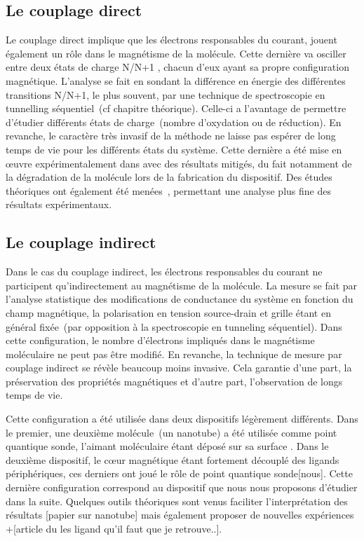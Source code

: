 \subsection{Le couplage direct}
Le couplage direct implique que les électrons responsables du courant, jouent également un rôle dans le magnétisme de la molécule. Cette dernière va osciller entre deux états de charge N/N+1 , chacun d'eux ayant sa propre configuration magnétique. L'analyse se fait en sondant la différence en énergie des différentes transitions N/N+1, le plus souvent, par une technique de spectroscopie en tunnelling séquentiel~(cf chapitre théorique). Celle-ci a l'avantage de permettre d'étudier différents états de charge~(nombre d'oxydation ou de réduction). En revanche, le caractère très invasif de la méthode ne laisse pas espérer de long temps de vie pour les différents états du système. Cette dernière a été mise en œuvre expérimentalement dans \cite{Heersche2006,Jo2006,Zyazin2010} avec des résultats mitigés, du fait notamment de la dégradation de la molécule lors de la fabrication du dispositif. Des études théoriques ont également été menées~\cite{Timm2006,Timm2007}, permettant une analyse plus fine des résultats expérimentaux.

\subsection{Le couplage indirect}

Dans le cas du couplage indirect, les électrons responsables du courant ne participent qu'indirectement au magnétisme de la molécule. La mesure se fait par l'analyse statistique des modifications de conductance du système en fonction du champ magnétique, la polarisation en tension source-drain et grille étant en général fixée~(par opposition à la spectroscopie en tunneling séquentiel). Dans cette configuration, le nombre d'électrons impliqués dans le magnétisme moléculaire ne peut pas être modifié. En revanche, la technique de mesure par couplage indirect se révèle beaucoup moins invasive. Cela garantie d'une part, la préservation des propriétés magnétiques et d'autre part, l'observation de longs temps de vie. 

Cette configuration a été utilisée dans deux dispositifs légèrement différents. Dans le premier, une deuxième molécule~(un nanotube) a été utilisée comme point quantique sonde, l'aimant moléculaire étant déposé sur sa surface \cite{Urdampilleta2011}. Dans le deuxième dispositif, le cœur magnétique étant fortement découplé des ligands périphériques, ces derniers ont joué le rôle de point quantique sonde[nous]. Cette dernière configuration correspond au dispositif que nous nous proposons d'étudier dans la suite. Quelques outils théoriques sont venus faciliter l'interprétation des résultats [papier sur nanotube] mais également proposer de nouvelles expériences~\cite{Jaafar2010} +[article du les ligand qu'il faut que je retrouve..].

